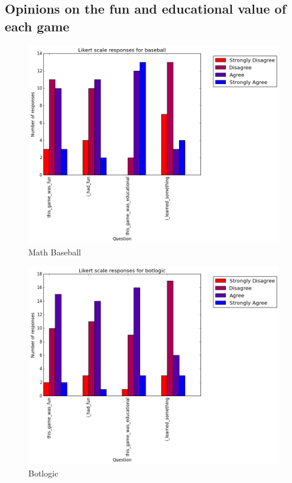 \cleardoublepage

		\subsection{Opinions on the fun and educational value of each game}

			\begin{figure}[h] 
			\centering 
			\includegraphics[width=\textwidth]{baseball_likert.png} 
			\caption{Math Baseball}
			\end{figure}

			\begin{figure}[h] 
			\centering 
			\includegraphics[width=\textwidth]{botlogic_likert.png} 
			\caption{Botlogic}
			\end{figure}

